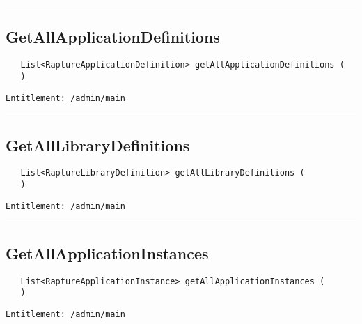 \rule{12cm}{2pt}
\subsection{GetAllApplicationDefinitions}
\label{Api:GetAllApplicationDefinitions}
\begin{verbatim}
   List<RaptureApplicationDefinition> getAllApplicationDefinitions (
   )
\end{verbatim}
\begin{Verbatim}[fontsize=\small, formatcom=\color{Maroon}]
  Entitlement: /admin/main
\end{Verbatim}



\rule{12cm}{2pt}
\subsection{GetAllLibraryDefinitions}
\label{Api:GetAllLibraryDefinitions}
\begin{verbatim}
   List<RaptureLibraryDefinition> getAllLibraryDefinitions (
   )
\end{verbatim}
\begin{Verbatim}[fontsize=\small, formatcom=\color{Maroon}]
  Entitlement: /admin/main
\end{Verbatim}



\rule{12cm}{2pt}
\subsection{GetAllApplicationInstances}
\label{Api:GetAllApplicationInstances}
\begin{verbatim}
   List<RaptureApplicationInstance> getAllApplicationInstances (
   )
\end{verbatim}
\begin{Verbatim}[fontsize=\small, formatcom=\color{Maroon}]
  Entitlement: /admin/main
\end{Verbatim}



